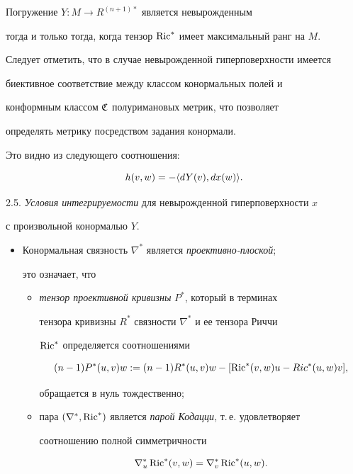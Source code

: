 Погружение $Y: M \to R^{(n+1)*} $ является невырожденным


тогда и только тогда, когда тензор $\operatorname{Ric}^*$ имеет максимальный ранг на $M$.





Следует отметить, что в случае невырожденной гиперповерхности имеется


биективное соответствие между классом конормальных полей и


конформным классом $\frak C$ полуримановых метрик, что позволяет


определять метрику посредством задания конормали.


Это видно из следующего соотношения:


$$


h(v,w)= - \la dY(v), dx(w)\ra.


$$








2.5. {\it Условия интегрируемости} для невырожденной гиперповерхности $x$


с произвольной конормалью $Y$.


\begin{itemize}


\item[(i)]


Конормальная связность $\nabla^*$ является {\it проективно-плоской};


это означает, что


\begin{itemize}


\item[(a)]


{\it тензор проективной кривизны} $P^*$, который в терминах


тензора кривизны $R^*$ связности $\nabla^*$ и ее тензора Риччи


$\operatorname{Ric}^*$ определяется соотношениями


$$


(n-1)P^*(u,v)w := (n-1)R^*(u,v)w - [\Ric^*(v,w)u - \\Ric^*(u,w)v],


$$


обращается в нуль тождественно;


\item[(b)]


пара $(\nabla^*,\operatorname{Ric}^*)$ является {\it парой Кодацци}, т.\,е. удовлетворяет


соотношению полной симметричности


$$


\nabla^*_u \Ric^*(v,w) = \nabla^*_v \Ric^*(u,w).


$$


\end{itemize}


\end{itemize}


